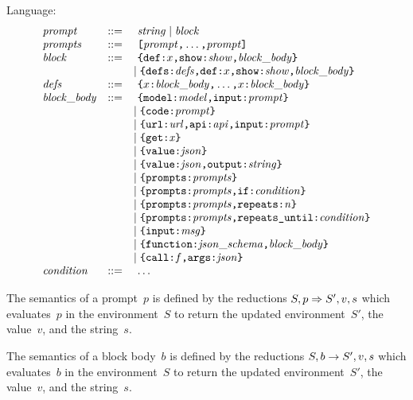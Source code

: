 \documentclass{article}
\begin{document}
Language:
$$
\begin{array}{lcl}
    \mit{prompt} & ::= &\ 
        \mit{string}
        \mid \mit{block}
    \\
    \mit{prompts} & ::= &\ 
        \jsarr{\mit{prompt}\mtt{,} \dots\mtt{,} \mit{prompt}}
    \\
    \mit{block} & ::= &\
    \pdlblock[\mit{show}]{x}{\mit{block\_body}}
    \\ &&\mid
    \pdlblockdefs{\mit{defs}}{\pdlblockstar[\mit{show}]{x}{\mit{block\_body}}}
    \\
    \mit{defs} & ::= &\
    \jsobj{\pdldef{x}{\mit{block\_body}}\mtt{,} \dots\mtt{,}\pdldef{x}{\mit{block\_body}}}
    \\
    \mit{block\_body} & ::= &\ 
    \pdlmodel{\mit{model}}{\mit{prompt}}
    \\ &&\mid
    \pdlcode{\mit{prompt}}
    \\ &&\mid
    \pdlapi{\mit{url}}{\mit{api}}{\mit{prompt}}
    \\ &&\mid
    \pdlget{\mit{x}}
    \\ &&\mid
    \pdlvalue{\mit{json}}
    \\ &&\mid
    \pdlvaluep{\mit{json}}{\mit{string}}
    \\ &&\mid
    \pdlsequence{\mit{prompts}}
    \\ &&\mid
    \pdlif{\mit{prompts}}{\mit{condition}}
    \\ &&\mid
    \pdlrepeats{\mit{prompts}}{\mit{n}}
    \\ &&\mid
    \pdlrepeatsuntil{\mit{prompts}}{\mit{condition}}
    \\ &&\mid
    \pdlinput{\mit{msg}}
    \\ &&\mid
    \pdlfunction{\mit{json\_schema}}{\mit{block\_body}}
    \\ &&\mid
    \pdlcall{f}{\mit{json}}
    \\
    \mit{condition} & ::= &\ \dots

\end{array}
$$

The semantics of a prompt~$p$ is defined by the reductions ${S}, {p} \Rightarrow {S'}, {v}, {s}$ which evaluates~$p$ in the environment~$S$ to return the updated environment~$S'$, the value~$v$, and the string~$s$.

The semantics of a block body~$b$ is defined by the reductions ${S}, {b} \rightarrow {S'}, {v}, {s}$ which evaluates~$b$ in the environment~$S$ to return the updated environment~$S'$, the value~$v$, and the string~$s$.
\end{document}
